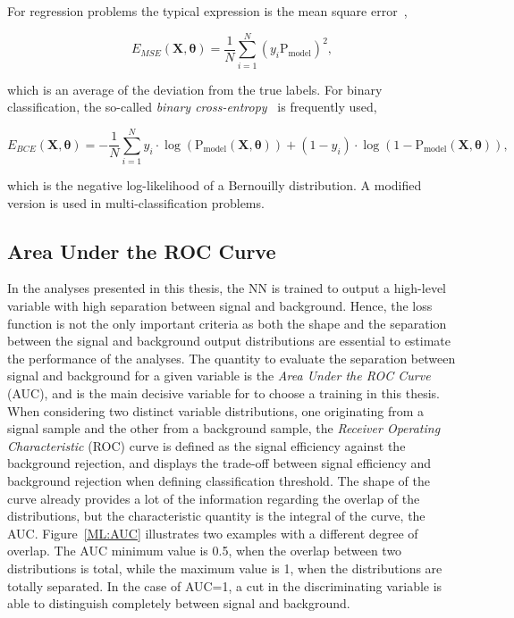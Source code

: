 For regression problems the typical expression is the mean square error~\cite{EncyclopediaofML}, 

\begin{equation}
    E_{MSE}(\mathbf{X},\boldsymbol{\theta}) = \frac{1}{N}\sum_{i=1}^N (y_i\text{P}_\text{model})^2,
\end{equation}

which is an average of the deviation from the true labels. For binary classification, the so-called \textit{binary cross-entropy}~\cite{binarycross} is frequently used, 

\begin{equation}
    E_{BCE}(\mathbf{X},\boldsymbol{\theta}) = -\frac{1}{N}\sum_{i=1}^N y_i\cdot\log(\text{P}_\text{model}(\mathbf{X},\boldsymbol{\theta}))+(1-y_i)\cdot\log(1-\text{P}_\text{model}(\mathbf{X},\mathbf{\theta})),
\end{equation}

which is the negative log-likelihood of a Bernouilly distribution. A modified version is used in multi-classification problems. 

\subsection{Area Under the ROC Curve}

In the analyses presented in this thesis, the NN is trained to output a high-level variable with high separation between signal and background. Hence, the loss function is not the only important criteria as both the shape and the separation between the signal and background output distributions are essential to estimate the performance of the analyses. The quantity to evaluate the separation between signal and background for a given variable is the \textit{Area Under the ROC Curve} (AUC), and is the main decisive variable for to choose a training in this thesis.\\

When considering two distinct variable distributions, one originating from a signal sample and the other from a background sample, the \textit{Receiver Operating Characteristic} (ROC) curve is defined as the signal efficiency against the background rejection, and displays the trade-off between signal efficiency and background rejection when defining classification threshold.%
The shape of the curve already provides a lot of the information regarding the overlap of the distributions, but the characteristic quantity is the integral of the curve, the AUC. Figure~\ref{ML:AUC} illustrates two examples with a different degree of overlap. The AUC minimum value is 0.5, when the overlap between two distributions is total, while the maximum value is 1, when the distributions are totally separated. In the case of AUC=1, a cut in the discriminating variable is able to distinguish completely between signal and background.

